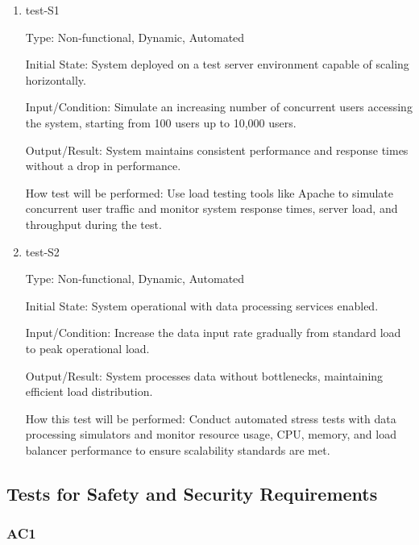 \documentclass[12pt, titlepage]{article}
\begin{document}
\begin{enumerate}

    \item{test-S1} \label{test-S1}
    
    Type: Non-functional, Dynamic, Automated
    
    Initial State: System deployed on a test server environment capable of scaling horizontally.
    
    Input/Condition: Simulate an increasing number of concurrent users accessing the system, starting from 100 users up to 10,000 users.
    
    Output/Result: System maintains consistent performance and response times without a drop in performance.
    
    How test will be performed: Use load testing tools like Apache to simulate concurrent user traffic and monitor system response times, server load, and throughput during the test.
    
    \item{test-S2} \label{test-S2}
    
    Type: Non-functional, Dynamic, Automated
    
    Initial State: System operational with data processing services enabled.
    
    Input/Condition: Increase the data input rate gradually from standard load to peak operational load.
    
    Output/Result: System processes data without bottlenecks, maintaining efficient load distribution.
    
    How this test will be performed: Conduct automated stress tests with data processing simulators and monitor resource usage, CPU, memory, and load balancer performance to ensure scalability standards are met.
    
\end{enumerate}


\subsection{Tests for Safety and Security Requirements} \label{section:4.3}

\subsubsection{AC1}
\end{document}
